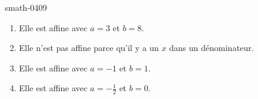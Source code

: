 
\begin{corrige}{smath-0409}

    \begin{enumerate}
        \item
            Elle est affine avec \( a=3\) et \( b=8\).
        \item
            Elle n'est pas affine parce qu'il y a un \( x\) dans un dénominateur.
        \item
            Elle est affine avec \( a=-1\) et \( b=1\).
        \item
            Elle est affine avec \( a=-\frac{ 1 }{2}\) et \( b=0\).
    \end{enumerate}

\end{corrige}
